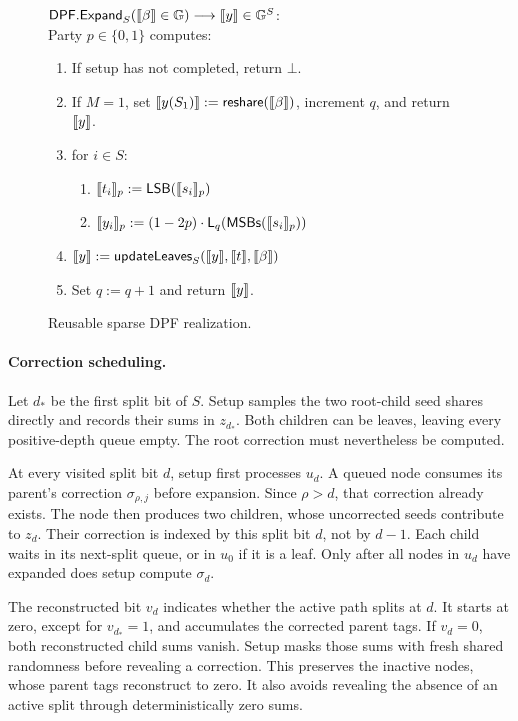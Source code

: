 \begin{figure}[H]
{\begin{minipage}{.95\textwidth}
    \vspace{\smallskipamount}
    \noindent
    $\mathsf{DPF.Expand}_{S}(\share\beta\in\mathbb G)
    \longrightarrow\share y\in\mathbb G^S$:\\[0.3em]
    Party $p\in\{0,1\}$ computes:
    \begin{enumerate}
        \item If setup has not completed, return $\bot$.
        \item If $M=1$, set $\share{y(S_1)}:=\mathsf{reshare}(\share\beta)$,
        increment $q$, and return $\share y$.
        \item for $i\in S$:
        \begin{enumerate}
            \item $\share{t_i}_p:=\lsb(\share{s_i}_p)$
            \item $\share{y_i}_p:=(1-2p)\cdot
            \mathsf{L}_q(\msbs(\share{s_i}_p))$
        \end{enumerate}
        \item $\share y:=\updateLeave_S(\share y,\share t,\share\beta)$
        \item Set $q:=q+1$ and return $\share y$.
    \end{enumerate}
    \end{minipage}}
\caption{%
 Reusable sparse DPF realization. \label{fig:sparseDpf}
}
\end{figure}

\paragraph{Correction scheduling.}
Let $d_*$ be the first split bit of $S$. Setup samples the two root-child
seed shares directly and records their sums in $z_{d_*}$.
Both children can be leaves, leaving every positive-depth queue empty.
The root correction must nevertheless be computed.

At every visited split bit $d$, setup first processes $u_d$.
A queued node consumes its parent's correction $\sigma_{\rho,j}$ before
expansion. Since $\rho>d$, that correction already exists.
The node then produces two children, whose uncorrected seeds contribute to
$z_d$. Their correction is indexed by this split bit $d$, not by $d-1$.
Each child waits in its next-split queue, or in $u_0$ if it is a leaf.
Only after all nodes in $u_d$ have expanded does setup compute $\sigma_d$.

The reconstructed bit $v_d$ indicates whether the active path splits at $d$.
It starts at zero, except for $v_{d_*}=1$, and accumulates the corrected
parent tags. If $v_d=0$, both reconstructed child sums vanish.
Setup masks those sums with fresh shared randomness before revealing a
correction. This preserves the inactive nodes, whose parent tags reconstruct
to zero. It also avoids revealing the absence of an active split through
deterministically zero sums.

